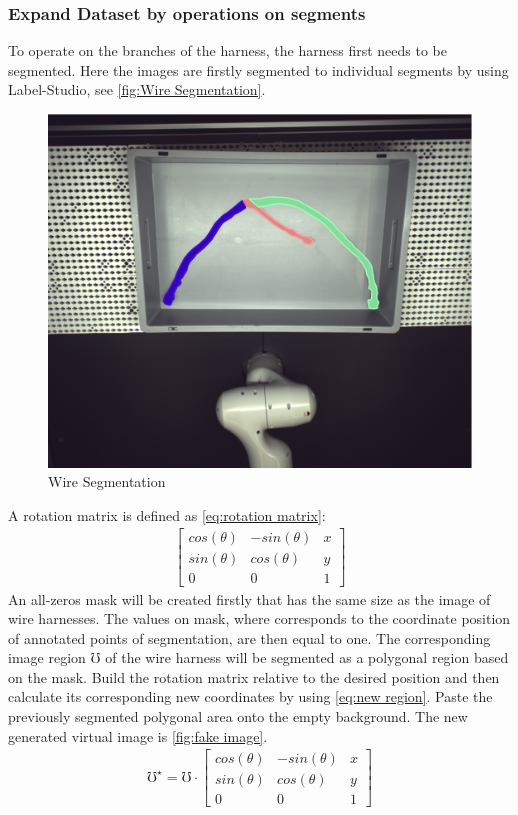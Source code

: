 \subsubsection{Expand Dataset by operations on segments} 
To operate on the branches of the harness, the harness first needs to be segmented. Here the images are firstly segmented to individual segments by using
Label-Studio, see \autoref{fig:Wire Segmentation}.\\
\begin{figure}
	\centering
	\includegraphics[width=0.6\linewidth]{example_images/img_0_segment}
	\caption{Wire Segmentation}
	\label{fig:Wire Segmentation}
\end{figure}
A rotation matrix is defined as \autoref{eq:rotation matrix}:
\begin{align}
	\begin{bmatrix}
		cos(\theta)&  -sin(\theta )&x \\
		sin(\theta )&  cos(\theta )&y  \\
		0&  0&1
	  \end{bmatrix} \label{eq:rotation matrix}
\end{align}
An all-zeros mask will be created firstly that has the same size as the image of wire harnesses. The values on mask, where corresponds to the coordinate position of
annotated points of segmentation, are then equal to one. The corresponding image region $\mho$ of the wire harness will be segmented as a polygonal region based on the mask.
Build the rotation matrix relative to the desired position and then calculate its corresponding new coordinates by using \autoref{eq:new region}. 
Paste the previously segmented polygonal area onto the empty background. The new generated virtual image is \autoref{fig:fake image}.
\begin{align}
	\mho ^{\star } = \mho \cdot \begin{bmatrix}
		cos(\theta)&  -sin(\theta )&x \\
		sin(\theta )&  cos(\theta )&y  \\
		0&  0&1
	  \end{bmatrix} \label{eq:new region}
\end{align}

